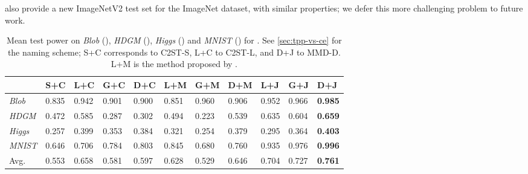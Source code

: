 \documentclass{article}
\begin{document}
\citet{recht:imagenet} also provide a new ImageNetV2 test set for the ImageNet dataset, with similar properties;
we defer this more challenging problem to future work.



















\begin{table*}[!t]
  \centering
  \footnotesize
  \caption{Mean test power on \emph{Blob} (), \emph{HDGM} (), \emph{Higgs} () and \emph{MNIST} () for .  See \cref{sec:tpp-vs-ce} for the naming scheme; S+C corresponds to C2ST-S, L+C to C2ST-L, and D+J to MMD-D.
  L+M is the method proposed by \citet{Matthias:deep-test}.
}\label{tab:CE_for_TST}
  \vspace{1mm}
    \begin{tabular}{lllllllllll}
    \toprule
& S+C & L+C & G+C & D+C & L+M & G+M & D+M & L+J & G+J & D+J \\
    \midrule
    \emph{Blob} 
& 0.835 & 0.942 & 0.901
    & 0.900
    & 0.851
    & 0.960
    & 0.906
    & 0.952 & 0.966 & {\bf 0.985} \\
    \emph{HDGM} 
& 0.472 & 0.585 & 0.287
    & 0.302
    & 0.494
    & 0.223
    & 0.539
    & 0.635 & 0.604 & {\bf 0.659} \\
\emph{Higgs}
    & 0.257 & 0.399 & 0.353
    & 0.384
    & 0.321
    & 0.254
    & 0.379
    & 0.295 & 0.364 & {\bf 0.403} \\
    \emph{MNIST}
& 0.646 & 0.706 & 0.784
    & 0.803
    & 0.845
    & 0.680
    & 0.760
    & 0.935 & 0.976 & {\bf 0.996} \\
    \midrule
    Avg.         & 0.553 & 0.658 & 0.581
    & 0.597
    & 0.628
    & 0.529
    & 0.646
    & 0.704 & 0.727 & {\bf 0.761} \\
    \bottomrule
    \end{tabular}\vspace{-1em}
\end{table*}
\end{document}
